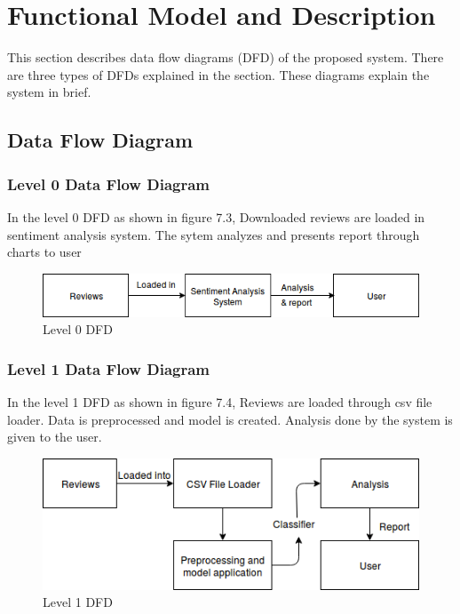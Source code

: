 \documentclass[oneside,a4paper,12pt]{pictreport}
\begin{document}
\section{Functional Model and Description}
This section describes data flow diagrams (DFD) of the proposed system. There are three types of DFDs explained in the section. These diagrams explain the system in brief.

\subsection{Data Flow Diagram}
\subsubsection{Level 0 Data Flow Diagram}
In the level 0 DFD as shown in figure 7.3, Downloaded reviews are loaded in sentiment analysis system. The sytem analyzes and presents report
through charts to user\\
\begin{figure}[h!]
\begin{center}
 


\includegraphics[width=4.5in]{level_0.png}
\caption{Level 0 DFD}
\end{center}
\end{figure}

\subsubsection{Level 1 Data Flow Diagram}
In the level 1 DFD as shown in figure 7.4, Reviews are loaded through csv file loader. Data is preprocessed and model is created.
Analysis done by the system is given to the user.\\
\begin{figure}[h!]
\includegraphics[width=4.5in]{level_1.png}
\caption{Level 1 DFD}
\end{figure}
\end{document}
